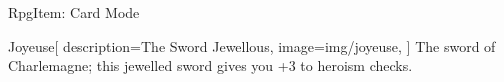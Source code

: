 \begin{ExampleBlock}{RpgItem: Card Mode}
\begin{RpgItem}[width=5cm, height=7cm]{Joyeuse}[
    description={The Sword Jewellous},
    image={img/joyeuse},
]
    The sword of Charlemagne; this jewelled sword gives you +3 to heroism checks.
\end{RpgItem}


\end{ExampleBlock}

